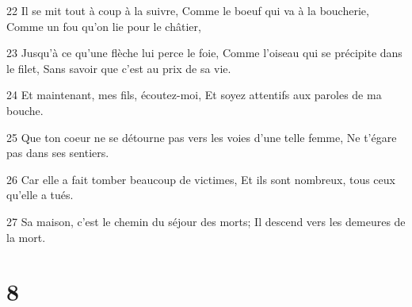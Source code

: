 \par 22 Il se mit tout à coup à la suivre, Comme le boeuf qui va à la boucherie, Comme un fou qu'on lie pour le châtier,
\par 23 Jusqu'à ce qu'une flèche lui perce le foie, Comme l'oiseau qui se précipite dans le filet, Sans savoir que c'est au prix de sa vie.
\par 24 Et maintenant, mes fils, écoutez-moi, Et soyez attentifs aux paroles de ma bouche.
\par 25 Que ton coeur ne se détourne pas vers les voies d'une telle femme, Ne t'égare pas dans ses sentiers.
\par 26 Car elle a fait tomber beaucoup de victimes, Et ils sont nombreux, tous ceux qu'elle a tués.
\par 27 Sa maison, c'est le chemin du séjour des morts; Il descend vers les demeures de la mort.

\chapter{8}

